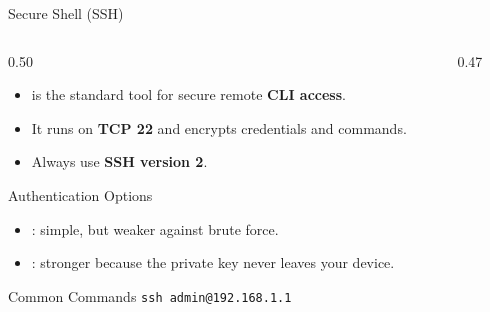 \documentclass[aspectratio=169]{beamer}  %
\begin{document}
\begin{frame}[t]{Secure Shell (SSH)}
    \begin{columns}[T]
        \begin{column}{0.50\textwidth}
            \begin{itemize}
                \item {} is the standard tool for secure remote \textbf{CLI access}.
                \item It runs on \textbf{TCP 22} and encrypts credentials and commands.
                \item Always use \textbf{SSH version 2}.
            \end{itemize}
            \vspace{0.3em}
            \begin{block}{Authentication Options}
                \begin{itemize}
                    \footnotesize
                    \item {}: simple, but weaker against brute force.
                    \item {}: stronger because the private key never leaves your device.
                \end{itemize}
            \end{block}
            \vspace{0.2em}
            \begin{exampleblock}{Common Commands}
                \footnotesize
                \texttt{ssh admin@192.168.1.1}
            \end{exampleblock}
        \end{column}
        \begin{column}{0.47\textwidth}
            \begin{center}
\end{center}
\end{column}
\end{columns}
\end{frame}
\end{document}
